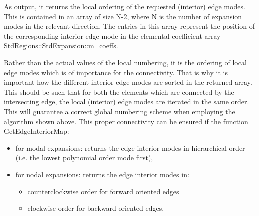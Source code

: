 As output, it returns the local ordering of the requested (interior) edge modes.
This is contained
 in an array of size N-2, where N is the number of expansion modes in the
 relevant direction. The entries in this array represent the position of the
 corresponding interior edge mode in the elemental coefficient array
 StdRegions::StdExpansion::m\_coeffs.

Rather than the actual values of the local numbering, it is the ordering of
local edge modes which is of importance for the connectivity. That is why it is
important how the different interior edge modes are sorted in the returned
array. This should be such that for both the elements which are connected by the
intersecting edge, the local (interior) edge modes are iterated in the same
order. This will guarantee a correct global numbering scheme when employing the
algorithm shown above. This proper connectivity can be ensured if the function
GetEdgeInteriorMap:

\begin{itemize}
\item for modal expansions: returns the edge interior modes in hierarchical
order (i.e. the lowest polynomial order mode first),
\item for nodal expansions: returns the edge interior modes in:
    \begin{itemize}
    \item counterclockwise order for forward oriented edges
    \item clockwise order for backward oriented edges.
    \end{itemize}
\end{itemize}
